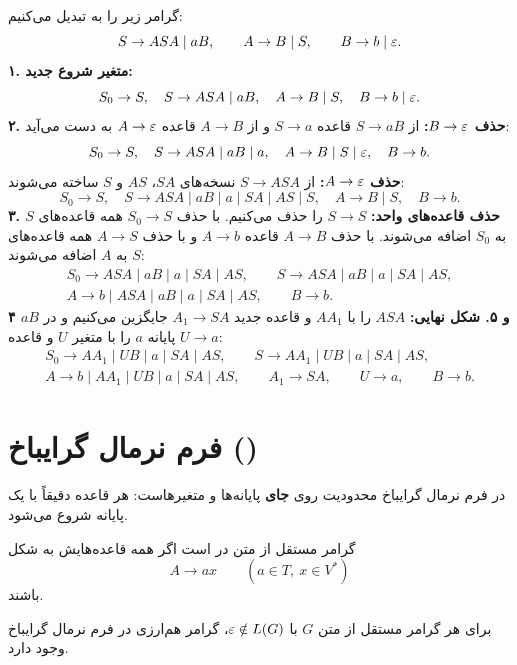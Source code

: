 \begin{example}
گرامر زیر را به  تبدیل می‌کنیم:
\[S\to ASA\mid aB,\qquad A\to B\mid S,\qquad B\to b\mid\varepsilon.\]
\textbf{۱. متغیر شروع جدید:}
\[S_0\to S,\quad S\to ASA\mid aB,\quad A\to B\mid S,\quad B\to b\mid\varepsilon.\]
\textbf{۲. حذف $B\to\varepsilon$:} از $S\to aB$ قاعده $S\to a$ و از $A\to B$ قاعده $A\to\varepsilon$ به دست می‌آید:
\[S_0\to S,\quad S\to ASA\mid aB\mid a,\quad A\to B\mid S\mid\varepsilon,\quad B\to b.\]
\textbf{حذف $A\to\varepsilon$:} از $S\to ASA$ نسخه‌های $SA$، $AS$ و $S$ ساخته می‌شوند:
\[S_0\to S,\quad S\to ASA\mid aB\mid a\mid SA\mid AS\mid S,\quad A\to B\mid S,\quad B\to b.\]
\textbf{۳. حذف قاعده‌های واحد:} $S\to S$ را حذف می‌کنیم. با حذف $S_0\to S$ همه قاعده‌های $S$ به $S_0$ اضافه می‌شوند. با حذف $A\to B$ قاعده $A\to b$ و با حذف $A\to S$ همه قاعده‌های $S$ به $A$ اضافه می‌شوند:
\[\begin{array}{l}
S_0\to ASA\mid aB\mid a\mid SA\mid AS,\qquad S\to ASA\mid aB\mid a\mid SA\mid AS,\\
A\to b\mid ASA\mid aB\mid a\mid SA\mid AS,\qquad B\to b.
\end{array}\]
\textbf{۴ و ۵. شکل نهایی:} $ASA$ را با $AA_1$ و قاعده جدید $A_1\to SA$ جایگزین می‌کنیم و در $aB$ پایانه $a$ را با متغیر $U$ و قاعده $U\to a$:
\[\begin{array}{l}
S_0\to AA_1\mid UB\mid a\mid SA\mid AS,\qquad S\to AA_1\mid UB\mid a\mid SA\mid AS,\\
A\to b\mid AA_1\mid UB\mid a\mid SA\mid AS,\qquad A_1\to SA,\qquad U\to a,\qquad B\to b.
\end{array}\]
\end{example}

\section{فرم نرمال گرایباخ ()}

در فرم نرمال گرایباخ محدودیت روی \textbf{جای} پایانه‌ها و متغیرهاست: هر قاعده دقیقاً با یک پایانه شروع می‌شود.

\begin{definition}
گرامر مستقل از متن در  است اگر همه قاعده‌هایش به شکل
\[A\to ax\qquad(a\in T,\ x\in V^*)\]
باشند.
\end{definition}

\begin{theorem}
برای هر گرامر مستقل از متن $G$ با $\varepsilon\notin L(G)$، گرامر هم‌ارزی در فرم نرمال گرایباخ وجود دارد.
\end{theorem}

